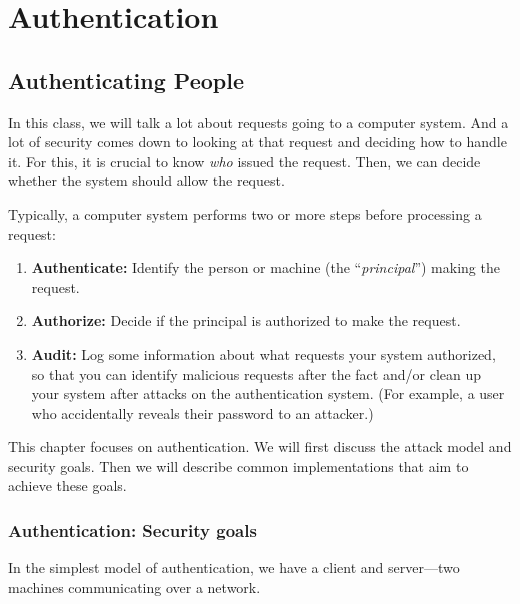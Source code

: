 \documentclass[
  letterpaper,
]{scrbook}
\providecommand{\tightlist}{%
  \setlength{\itemsep}{0pt}\setlength{\parskip}{0pt}}
\theoremstyle{definition}
\theoremstyle{plain}
\theoremstyle{plain}
\theoremstyle{remark}
\begin{document}
\part{Authentication}

\chapter{Authenticating People}\label{authenticating-people}

In this class, we will talk a lot about requests going to a computer
system. And a lot of security comes down to looking at that request and
deciding how to handle it. For this, it is crucial to know \emph{who}
issued the request. Then, we can decide whether the system should allow
the request.

Typically, a computer system performs two or more steps before
processing a request:

\begin{enumerate}
\def\labelenumi{\arabic{enumi}.}
\tightlist
\item
  \textbf{Authenticate:} Identify the person or machine (the
  ``\emph{principal}'') making the request.
\item
  \textbf{Authorize:} Decide if the principal is authorized to make the
  request.
\item
  \textbf{Audit:} Log some information about what requests your system
  authorized, so that you can identify malicious requests after the fact
  and/or clean up your system after attacks on the authentication
  system. (For example, a user who accidentally reveals their password
  to an attacker.)
\end{enumerate}

This chapter focuses on authentication. We will first discuss the attack
model and security goals. Then we will describe common implementations
that aim to achieve these goals.

\section{Authentication: Security
goals}\label{authentication-security-goals}

In the simplest model of authentication, we have a client and
server---two machines communicating over a network.

\end{document}
